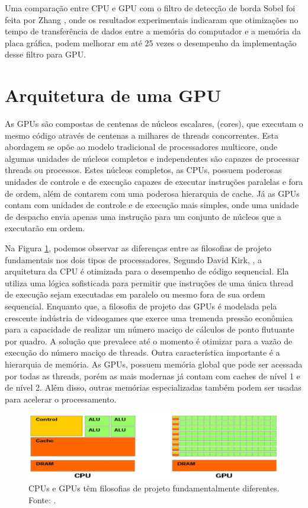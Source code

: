 Uma comparação entre CPU e GPU com o filtro de detecção de borda Sobel foi feita por Zhang \cite{ImgParallel}, onde os resultados experimentais indicaram que otimizações no tempo de transferência de dados entre a memória do computador e a memória da placa gráfica, podem melhorar em até 25 vezes o desempenho da implementação desse filtro para GPU.
\section{Arquitetura de uma GPU}
As GPUs são compostas de centenas de núcleos escalares, (cores), que executam o mesmo código através de centenas a milhares de threads concorrentes. Esta abordagem se opõe ao modelo tradicional de processadores multicore, onde algumas unidades de núcleos completos e independentes são capazes de processar threads ou processos. Estes núcleos completos, as CPUs, possuem poderosas unidades de controle e de execução capazes de executar instruções paralelas e fora de ordem, além de contarem com uma poderosa hierarquia de cache. Já as GPUs contam com unidades de controle e de execução mais simples, onde uma unidade de despacho envia apenas uma instrução para um conjunto de núcleos que a executarão em ordem. 

Na Figura \ref{fig:cpu_gpu}, podemos observar as diferenças entre as filosofias de projeto fundamentais nos dois tipos de processadores. Segundo David Kirk, \cite{programando}, a arquitetura da CPU é otimizada para o desempenho de código sequencial. Ela utiliza uma lógica sofisticada para permitir que instruções de uma única thread de execução sejam executadas em paralelo ou mesmo fora de sua ordem sequencial. Enquanto que, a filosofia de projeto das GPUs é modelada pela crescente indústria de videogames que exerce uma tremenda pressão econômica para a capacidade de realizar um número maciço de cálculos de ponto flutuante por quadro. A solução que prevalece até o momento é otimizar para a vazão de execução do número maciço de threads. Outra característica importante é a hierarquia de memória. As GPUs, possuem memória global que pode ser acessada por todas as threads, porém as mais modernas já contam com caches de nível 1 e de nível 2. Além disso, outras memórias especializadas também podem ser usadas para acelerar o processamento.

\FloatBarrier
\begin{figure}[!ht]
\centering
\includegraphics[width=14cm]{cpu_gpu.png}
\caption{CPUs e GPUs têm filosofias de projeto fundamentalmente diferentes. Fonte: \cite{programando}.}
\label{fig:cpu_gpu}
\end{figure}
\FloatBarrier
